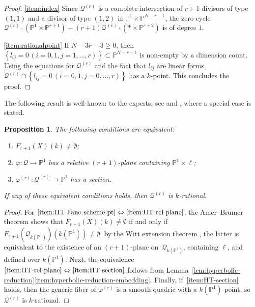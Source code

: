 \documentclass[JEP,XML,SOM,Unicode,NoEqCountersInSection,published]{cedram}
\let\cal\mathcal
\theoremstyle{plain}
\newtheorem{prop}[thm]{Proposition}
\theoremstyle{definition}
\let\phi\varphi
\renewcommand\P{\mathbb{P}}
\begin{document}
\begin{proof}
\eqref{item:index}
Since $\mathcal{Q}^{(r)}$ is a complete intersection of $r+1$ divisors of type $(1,1)$ and a divisor of type $(1,2)$ in $\P^1\times \P^{N-r-1}$,
the zero-cycle $\mathcal{Q}^{(r)}\cdot (\P^1\times \P^{r+1}) - (r+1) \mathcal{Q}^{(r)}\cdot (*\times \P^{r+2})$ is of degree $1$.

\eqref{item:rationalpoint}
If $N-3r-3\geq 0$,
then $\left\{l_{ij}=0\, (i=0,1, j=1,\dots, r)\right\} \subset\P^{N-r-1}$
is non-empty by a dimension count.
Using the equations for $\mathcal{Q}^{(r)}$
and the fact that $l_{ij}$ are linear forms, $\mathcal{Q}^{(r)}\cap\left\{l_{ij}=0\, (i=0,1, j=0,\dots, r)\right\}$ has a $k$\nobreakdash-point.
This concludes the proof.
\end{proof}

The following result is well-known to the experts; see \cite[Rem.\,3.4.1(a)]{CTSSD} and \cite[\S 6.1]{HT-equivariant}, where a special case
is stated.

\begin{prop}\label{HT}
The following conditions are equivalent:
\begin{enumerate}
\item\label{item:HT-Fano-scheme-pt} $F_{r+1}(X)(k)\neq \emptyset$;
\item\label{item:HT-rel-plane} $\phi\colon \mathcal{Q}\to \P^1$ has
a relative
$(r+1)$-plane containing $\P^1\times \ell$;
\item\label{item:HT-section} $\phi^{(r)}\colon\mathcal{Q}^{(r)}\to \P^1$
has a section.
\end{enumerate}
If any of these equivalent conditions holds,
then $\mathcal{Q}^{(r)}$ is $k$\nobreakdash-rational.
\end{prop}

\begin{proof}
For $\eqref{item:HT-Fano-scheme-pt}\Leftrightarrow\eqref{item:HT-rel-plane}$, the Amer--Brumer theorem \cite[Th.\,2.2]{Leep} shows that $F_{r+1}(X)(k)\neq\emptyset$ if and only if $F_{r+1}(\mathcal{Q}_{k(\P^1)})(k(\P^1))\neq\emptyset$;
by the Witt extension theorem \cite[Th.\,8.3]{EKM-quadratic-forms},
the latter is equivalent to the existence of an $(r+1)$-plane
on~$\mathcal{Q}_{k(\P^1)}$, containing $\ell$, and defined over $k(\P^1)$.
Next, the equivalence $\eqref{item:HT-rel-plane}\Leftrightarrow\eqref{item:HT-section}$
follows from Lemma~\ref{lem:hyperbolic-reduction}\eqref{item:hyperbolic-reduction-embedding}.
Finally, if~\eqref{item:HT-section} holds, then the generic fiber of \(\phi^{(r)}\) is a smooth quadric with a \(k(\P^1)\)-point, so \(\cal Q^{(r)}\) is \(k\)-rational.
\end{proof}
\end{document}
